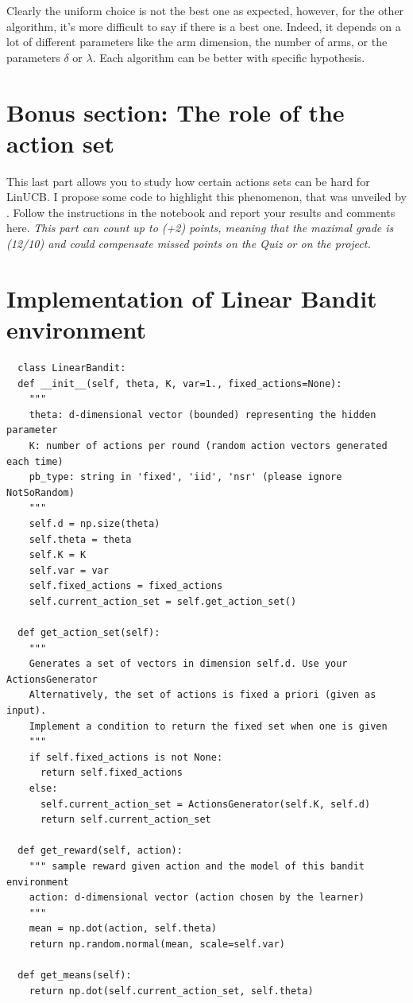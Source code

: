 \begin{itemize}
    Clearly the uniform choice is not the best one as expected, however, for the other algorithm, it's more difficult to say if there is a best one. Indeed, it depends on a lot of different parameters like the arm dimension, the number of arms, or the parameters $\delta$ or $\lambda$. Each algorithm can be better with specific hypothesis.

\end{itemize}



\newpage





\appendix

\section{Bonus section: The role of the action set}

This last part allows you to study how certain actions sets can be hard for LinUCB. I propose some code to highlight this phenomenon, that was unveiled by \citet{lattimore2017end}. 
Follow the instructions in the notebook and report your results and comments here. 
\emph{This part can count up to (+2) points, meaning that the maximal grade is (12/10) and could compensate missed points on the Quiz or on the project. }

\section{Implementation of \textbf{Linear Bandit} environment}
\begin{verbatim}
  class LinearBandit:
  def __init__(self, theta, K, var=1., fixed_actions=None):
    """
    theta: d-dimensional vector (bounded) representing the hidden parameter
    K: number of actions per round (random action vectors generated each time)
    pb_type: string in 'fixed', 'iid', 'nsr' (please ignore NotSoRandom)
    """
    self.d = np.size(theta)
    self.theta = theta
    self.K = K
    self.var = var
    self.fixed_actions = fixed_actions
    self.current_action_set = self.get_action_set()

  def get_action_set(self):
    """
    Generates a set of vectors in dimension self.d. Use your ActionsGenerator
    Alternatively, the set of actions is fixed a priori (given as input).
    Implement a condition to return the fixed set when one is given
    """
    if self.fixed_actions is not None:
      return self.fixed_actions
    else:
      self.current_action_set = ActionsGenerator(self.K, self.d)
      return self.current_action_set

  def get_reward(self, action):
    """ sample reward given action and the model of this bandit environment
    action: d-dimensional vector (action chosen by the learner)
    """
    mean = np.dot(action, self.theta)
    return np.random.normal(mean, scale=self.var)

  def get_means(self):
    return np.dot(self.current_action_set, self.theta)
\end{verbatim}


